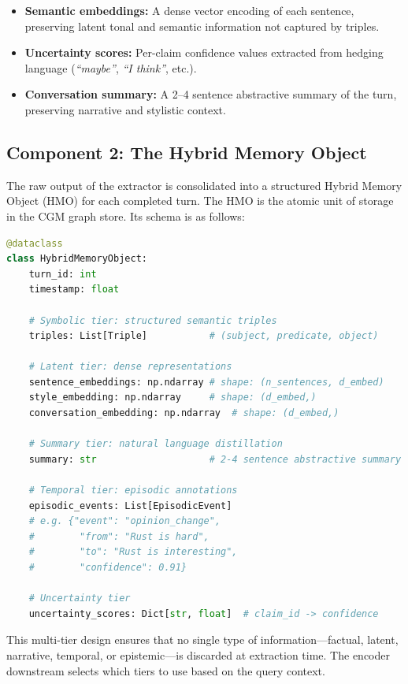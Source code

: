\documentclass[11pt, a4paper, twoside]{article}
\theoremstyle{definition}
\newcommand{\CGM}{\textsc{CGM}\xspace}
\begin{document}
\begin{itemize}[leftmargin=*]
  \item \textbf{Semantic embeddings:} A dense vector encoding of each sentence,
    preserving latent tonal and semantic information not captured by triples.
  \item \textbf{Uncertainty scores:} Per-claim confidence values extracted from
    hedging language (\textit{``maybe''}, \textit{``I think''}, etc.).
  \item \textbf{Conversation summary:} A 2--4 sentence abstractive summary of
    the turn, preserving narrative and stylistic context.
\end{itemize}

\subsection{Component 2: The Hybrid Memory Object}
\label{sec:hybridobject}

The raw output of the extractor is consolidated into a structured Hybrid Memory
Object (HMO) for each completed turn. The HMO is the atomic unit of storage in
the \CGM graph store. Its schema is as follows:

\begin{lstlisting}[language=Python, caption={Hybrid Memory Object schema (Python
dataclass representation).}]
@dataclass
class HybridMemoryObject:
    turn_id: int
    timestamp: float

    # Symbolic tier: structured semantic triples
    triples: List[Triple]           # (subject, predicate, object)

    # Latent tier: dense representations
    sentence_embeddings: np.ndarray # shape: (n_sentences, d_embed)
    style_embedding: np.ndarray     # shape: (d_embed,)
    conversation_embedding: np.ndarray  # shape: (d_embed,)

    # Summary tier: natural language distillation
    summary: str                    # 2-4 sentence abstractive summary

    # Temporal tier: episodic annotations
    episodic_events: List[EpisodicEvent]
    # e.g. {"event": "opinion_change",
    #        "from": "Rust is hard",
    #        "to": "Rust is interesting",
    #        "confidence": 0.91}

    # Uncertainty tier
    uncertainty_scores: Dict[str, float]  # claim_id -> confidence
\end{lstlisting}

This multi-tier design ensures that no single type of information---factual,
latent, narrative, temporal, or epistemic---is discarded at extraction time.
The encoder downstream selects which tiers to use based on the query context.
\end{document}
